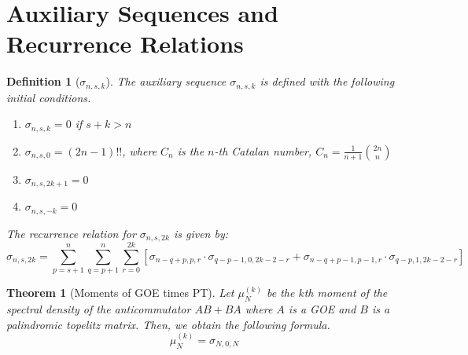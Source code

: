 \documentclass{article}
\newtheorem{theorem}{Theorem}
\newtheorem{definition}{Definition}
\begin{document}
\section{Auxiliary Sequences and Recurrence Relations}

\begin{definition}[\(\sigma_{n, s, k}\)]
The auxiliary sequence \(\sigma_{n, s, k}\) is defined with the following initial conditions. 
\begin{enumerate}
    \item \(\sigma_{n, s, k} = 0\) if \(s + k > n\)
    \item \(\sigma_{n, s, 0} = (2n - 1)!!\), where \(C_n\) is the \(n\)-th Catalan number, \(C_n = \frac{1}{n + 1} \binom{2n}{n}\)
    \item \(\sigma_{n, s, 2k + 1} = 0\)
    \item \(\sigma_{n, s, -k} = 0\)
\end{enumerate}

The recurrence relation for \(\sigma_{n, s, 2k}\) is given by:
\[
\sigma_{n, s, 2k} = 
\sum_{p = s + 1}^{n} 
\sum_{q = p + 1}^{n}
\sum_{r = 0}^{2k}
\left[
\sigma_{n - q + p, p, r} \cdot \sigma_{q - p - 1, 0, 2k - 2 - r}
+ 
\sigma_{n - q + p - 1, p - 1, r} \cdot \sigma_{q - p, 1, 2k - 2 - r}
\right]
\]
\end{definition}

\begin{theorem}[Moments of GOE times PT]
Let $\mu^{(k)}_N$ be the $k$th moment of the spectral density of 
the anticommutator $AB + BA$ where $A$ is a GOE and $B$ is 
a palindromic topelitz matrix. Then, we obtain the following formula. 
\[
    \mu^{(k)}_N = \sigma_{N, 0, N}
\]
\end{theorem}
\end{document}
